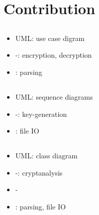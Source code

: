 \section{Contribution}



\subsection{\dd}
\begin{itemize}
\item UML: use case digram
\item \rsa-\cs: encryption, decryption
\item \cry{} \cf: \cl{} parsing
\end{itemize}

\subsection{\md}
\begin{itemize}
\item UML: sequence diagrams
\item \rsa-\cs: key-generation
\item \cry{} \cf: file IO
\end{itemize}

\subsection{\vp}
\begin{itemize}
\item UML: class diagram
\item \rsa-\cs: cryptanalysis
\item \dummy-\cs
\item \cry{} \cf: \cl{} parsing, file IO
\end{itemize}
